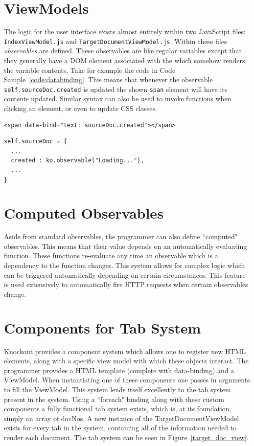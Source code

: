 \documentclass{l4proj}
\newcommand{\code}[1]{\texttt{#1}}
\newenvironment{codelisting}{\captionsetup{type=listing}}{}
\begin{document}
\section{ViewModels}
The logic for the user interface exists almost entirely within two JavaScript files: \code{IndexViewModel.js} and \code{TargetDocumentViewModel.js}. Within these files \textit{observables} are defined. These observables are like regular variables except that they generally have a DOM element associated with the which somehow renders the variable contents.
Take for example the code in Code Sample~\ref{code:databinding}. This means that whenever the observable \code{self.sourceDoc.created} is updated the shown \code{span} element will have its contents updated. Similar syntax can also be used to invoke functions when clicking an element, or even to update CSS classes.
\begin{codelisting}
\begin{verbatim}
<span data-bind="text: sourceDoc.created"></span>
\end{verbatim}
\begin{verbatim}
self.sourceDoc = {
  ...
  created : ko.observable("Loading..."),
  ...
}
\end{verbatim}
\label{code:databinding}
\end{codelisting}

\section{Computed Observables}
Aside from standard observables, the programmer can also define ``computed" observables. This means that their value depends on an automatically evaluating function. These functions re-evaluate any time an observable which is a dependency to the function changes. This system allows for complex logic which can be triggered automatically depending on certain circumstances.
This feature is used extensively to automatically fire HTTP requests when certain observables change.

\section{Components for Tab System}
Knockout provides a component system which allows one to register new HTML elements, along with a specific view model with which these objects interact. The programmer provides a HTML template (complete with data-binding) and a ViewModel. When instantiating one of these components one passes in arguments to fill the ViewModel.
This system lends itself excellently to the tab system present in the system. Using a ``foreach" binding along with these custom components a fully functional tab system exists, which is, at its foundation, simply an array of docNos. A new instance of the TargetDocumentViewModel exists for every tab in the system, containing all of the information needed to render each document. The tab system can be seen in Figure~\ref{target_doc_view}.
\end{document}
